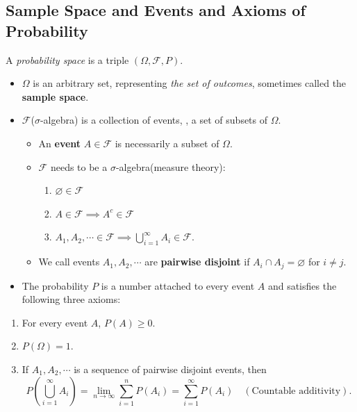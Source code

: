 \documentclass[12pt,a4paper]{article}
\theoremstyle{definition}
\theoremstyle{definition}
\theoremstyle{definition}
\theoremstyle{definition}
\theoremstyle{remark}
\theoremstyle{definition}
\newcommand{\ie}{\text{i.e.}}
\begin{document}
\subsection{Sample Space and Events and Axioms of Probability}
A \textit{probability space} is a triple $(\Omega,\mathscr{F},P)$.\begin{itemize}
	\item $\Omega$ is an arbitrary set, representing \textit{the set of outcomes}, sometimes called the \textbf{sample space}.
	\item $\mathscr{F}$($\sigma$-algebra) is a collection of events, \ie, a set of subsets of $\Omega$.\begin{itemize}
		\item An \textbf{event} $A\in\mathscr{F}$ is necessarily a subset of $\Omega$.
		\item $\mathscr{F}$ needs to be a $\sigma$-algebra(measure theory):\begin{enumerate}[(1)]
			\item $\varnothing\in\mathscr{F}$
			\item $A\in\mathscr{F}\implies A^c\in\mathscr{F}$
			\item $A_1,A_2,\cdots\in\mathscr{F}\implies\bigcup_{i=1}^\infty A_i\in\mathscr{F}$.
		\end{enumerate}
		\item We call events $A_1,A_2,\cdots$ are \textbf{pairwise disjoint} if $A_i\cap A_j=\varnothing$ for $i\neq j$.
	\end{itemize}
	\item The probability $P$ is a number attached to every event $A$ and satisfies the following three axioms:
\end{itemize}

\begin{tcolorbox}[colback=white]
	\begin{enumerate}
		\item For every event $A$, $P(A)\geq0$.
		\item $P(\Omega)=1$.
		\item If $A_1,A_2,\cdots$ is a sequence of pairwise disjoint events, then \[
		P\left(\bigcup_{i=1}^\infty A_i\right)=\lim\limits_{n\to\infty}\sum_{i=1}^nP(A_i)=\sum_{i=1}^\infty P(A_i)\quad(\text{Countable additivity}).
		\]
	\end{enumerate}
\end{tcolorbox}
\end{document}
